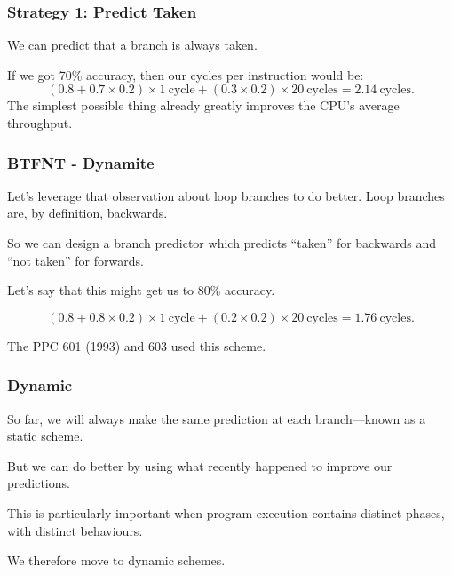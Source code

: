 \begin{frame}
\frametitle{Strategy 1: Predict Taken}

We can predict that a branch is always taken. 

If we got 70\% accuracy, then our cycles per instruction would be:
\[
(0.8 + 0.7 \times 0.2) \times 1 \mathrm{~cycle} + (0.3 \times 0.2) \times 20 \mathrm{~cycles} = 2.14 \mathrm{~cycles}.
\]
The simplest possible thing already greatly improves the CPU's average throughput.

\end{frame}



\begin{frame}
\frametitle{BTFNT - Dynamite}

Let's leverage that observation about loop branches to do better.
Loop branches are, by definition, backwards. 

So we can design a branch predictor which predicts ``taken''
for backwards and ``not taken'' for forwards. 

Let's say that this might get us to 80\% accuracy. 

\[
(0.8 + 0.8 \times 0.2) \times 1 \mathrm{~cycle} + (0.2 \times 0.2) \times 20 \mathrm{~cycles} = 1.76 \mathrm{~cycles}.
\]


The PPC 601 (1993) and 603 used this scheme.

\end{frame}


\begin{frame}
\frametitle{Dynamic}

So far, we will always make the same prediction at each branch---known as a
\alert{static} scheme. 

But we can do better by using what recently happened to
improve our predictions. 

This is particularly important when program execution
contains distinct phases, with distinct behaviours.


We therefore move to \alert{dynamic} schemes.

\end{frame}



